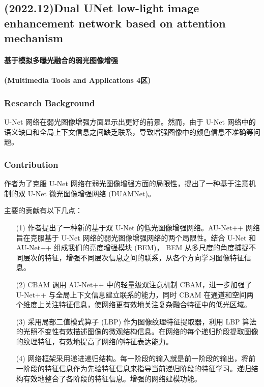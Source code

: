 \documentclass[a4paper]{ctexart}
\begin{document}
	\subsection{(2022.12)Dual UNet low-light image enhancement network based on attention mechanism}
	
	\paragraph{基于模拟多曝光融合的弱光图像增强}
	
	\paragraph{(Multimedia Tools and Applications 4区)}
	
	\subsubsection{Research Background}
	
	U-Net 网络在弱光图像增强方面显示出更好的前景。然而，由于 U-Net 网络中的语义缺口和全局上下文信息之间缺乏联系，导致增强图像中的颜色信息不准确等问题。
	
	\subsubsection{Contribution}
	
	作者为了克服 U-Net 网络在弱光图像增强方面的局限性，提出了一种基于注意机制的双 U-Net 微光图像增强网络 (DUAMNet)。
	
	主要的贡献有以下几点：
	
	\begin{itemize}
		\item[(1)] 
		作者提出了一种新的基于双 U-Net 的低光图像增强网络。AU-Net++ 网络旨在克服基于 U-Net 网络的弱光图像增强网络的两个局限性。结合 U-Net 和 AU-Net++ 组成我们的亮度增强模块 (BEM)， BEM 从多尺度的角度捕捉不同层次的特征，增强不同层次信息之间的联系，从各个方向学习图像特征信息。
		
		\item[(2)]
		CBAM 调用 AU-Net++ 中的轻量级双注意机制 CBAM，进一步加强了 U-Net++ 与全局上下文信息建立联系的能力，同时 CBAM 在通道和空间两个维度上关注特征信息，使网络更有效地关注复杂融合特征中的低光区域。
		
		\item[(3)]
		采用局部二值模式算子 (LBP) 作为图像纹理特征提取器，利用 LBP 算法的光照不变性有效描述图像的微观结构信息。在网络的每个递归阶段提取图像的纹理特征，有效地提高了网络的特征表达能力。
		
		\item[(4)]
		网络框架采用递进递归结构。每一阶段的输入就是前一阶段的输出，将前一阶段的特征信息作为先验特征信息来指导当前递归阶段的特征学习。递归结构有效地整合了各阶段的特征信息。增强的网络建模功能。
		
	\end{itemize}	
	
\end{document}
